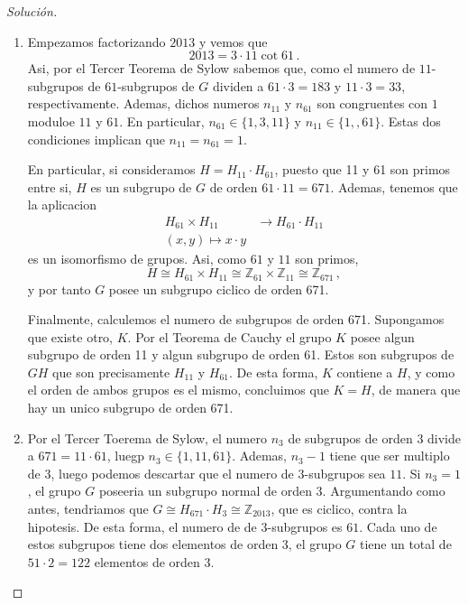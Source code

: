 \documentclass[a4paper,11pt]{amsart}
\theoremstyle{plain}
\theoremstyle{definition}
\theoremstyle{remark}
\newenvironment{solution}
  {\begin{proof}[Solución]}
  {\end{proof}}
\begin{document}
\begin{solution}
\begin{enumerate}
    \item Empezamos factorizando $2013$ y vemos que 
    $$2013 = 3 \cdot 11 \cot 61 \, .$$
    Asi, por el Tercer Teorema de Sylow sabemos que, como el numero de $11$-subgrupos de $61$-subgrupos de $G$ dividen a $61 \cdot 3 = 183$ y $11 \cdot 3 = 33$, respectivamente. Ademas, dichos numeros $n_{11}$ y $n_{61}$ son congruentes con $1$ moduloe $11$ y $61$. En particular, $n_{61} \in \{1, 3, 11 \}$ y $n_{11} \in \{1, , 61\}$. Estas dos condiciones implican que $n_{11} = n_{61} = 1$.
    
    En particular, si consideramos $H = H_{11} \cdot H_{61}$, puesto que 11 y 61 son primos entre si, $H$ es un subgrupo de $G$ de orden $61 \cdot 11 = 671$. Ademas, tenemos que la aplicacion 
\begin{align*}
    H_{61} \times H_{11}  & \to H_{61}\cdot H_{11}\\
    (x, y) \mapsto x\cdot y
 \end{align*}
 es un isomorfismo de grupos. Asi, como $61$ y $11$ son primos, 
 $$H \cong H_{61}\times H_{11} \cong \mathbb{Z}_{61} \times \mathbb{Z}_{11} \cong \mathbb{Z}_{671} \, ,$$
 y por tanto $G$ posee un subgrupo ciclico de orden 671.
 
 Finalmente, calculemos el numero de subgrupos de orden 671. Supongamos que existe otro, $K$. Por el Teorema de Cauchy el grupo $K$ posee algun subgrupo de orden 11 y algun subgrupo de orden 61. Estos son subgrupos de $GH$ que son precisamente $H_{11}$ y $H_{61}$. De esta forma, $K$ contiene a $H$, y como el orden de ambos grupos es el mismo, concluimos que $K =H$, de manera que hay un unico subgrupo de orden 671.
 \item Por el Tercer Toerema de Sylow, el numero $n_3$ de subgrupos de orden 3 divide a $671 = 11 \cdot 61$, luegp $n_3 \in \{ 1, 11, 61\}$. Ademas, $n_3 - 1$ tiene que ser multiplo de $3$, luego podemos descartar que el numero de $3$-subgrupos sea $11$. Si $n_3 = 1$, el grupo $G$ poseeria un subgrupo normal de orden $3$. Argumentando como antes, tendriamos que $G\cong H_{671} \cdot H_3 \cong \mathbb{Z}_{2013}$, que es ciclico, contra la hipotesis. De esta forma, el numero de de $3$-subgrupos es $61$. Cada uno de estos subgrupos tiene dos elementos de orden $3$, el grupo $G$ tiene un total de $51 \cdot 2 = 122$ elementos de orden $3$.
\end{enumerate}
\end{solution}
\end{document}
